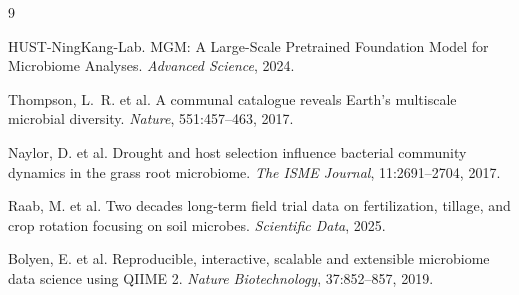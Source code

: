 \documentclass[11pt,a4paper]{article}
\begin{document}

\begin{thebibliography}{9}

HUST-NingKang-Lab.
\newblock MGM: A Large-Scale Pretrained Foundation Model for Microbiome Analyses.
\newblock \emph{Advanced Science}, 2024.

Thompson, L.~R. et al.
\newblock A communal catalogue reveals Earth's multiscale microbial diversity.
\newblock \emph{Nature}, 551:457--463, 2017.

Naylor, D. et al.
\newblock Drought and host selection influence bacterial community dynamics in the grass root microbiome.
\newblock \emph{The ISME Journal}, 11:2691--2704, 2017.

Raab, M. et al.
\newblock Two decades long-term field trial data on fertilization, tillage, and crop rotation focusing on soil microbes.
\newblock \emph{Scientific Data}, 2025.

Bolyen, E. et al.
\newblock Reproducible, interactive, scalable and extensible microbiome data science using QIIME 2.
\newblock \emph{Nature Biotechnology}, 37:852--857, 2019.

\end{thebibliography}
\end{document}
